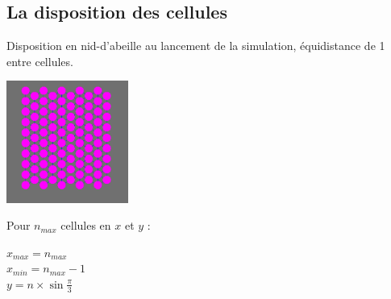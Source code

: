 \documentclass{beamer}
\begin{document}
\subsection{La disposition des cellules}
\begin{frame}
  Disposition en nid-d'abeille au lancement de la simulation, équidistance de 1 entre cellules.
  \begin{center}
    \includegraphics[width=4cm]{Images/hexagone.png}
  \end{center}
  Pour $n_{max}$ cellules en $x$ et $y$ : \\
  \begin{center}
    $x_{max} = n_{max}$ \\
    $x_{min} = n_{max} - 1$ \\
    $y = n \times \sin{\frac{\pi}{3}}$
  \end{center}
\end{frame}
\end{document}
